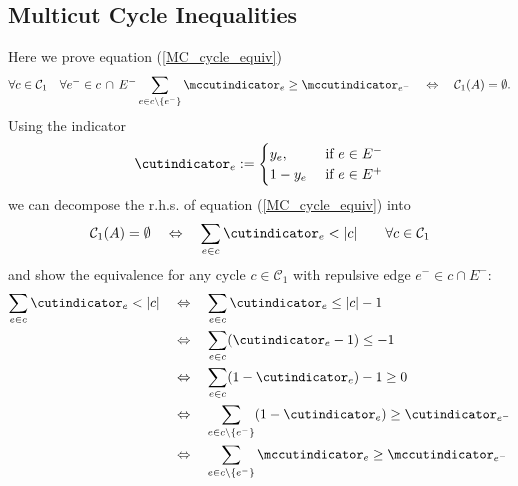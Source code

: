 
\subsection{Multicut Cycle Inequalities} \label{mccycle}

Here we prove equation (\ref{MC_cycle_equiv}) 
\begin{equation*}
  \forall c \in \mathcal{C}_1 \quad \forall e^- \in c \, \cap \, E^-  \sum_{e \in c\setminus \{e^-\}} \mccutindicator_e \ge \mccutindicator_{e^-} \quad \Leftrightarrow 
 \quad \mathcal{C}_1(A) = \emptyset.
\end{equation*}
Using the indicator $$\cutindicator_e: = \begin{cases}
        y_e, &\text{ if }e\in E^-\\
        1-y_e &\text{ if }e\in E^+\\
    \end{cases}$$
we can decompose the r.h.s. of equation (\ref{MC_cycle_equiv}) into 
\begin{equation}
\mathcal{C}_1(A) = \emptyset \quad \Leftrightarrow \quad  \sum_{e \in c} \cutindicator_e < |c| \qquad \forall c \in \mathcal{C}_1 \label{MC_cycle_equiv_supp}
\end{equation}
and show the equivalence for any cycle $ c \in \mathcal{C}_1$ with repulsive edge $e^- \in c \cap E^-$:
\begin{align*}
\sum_{e \in c} \cutindicator_e < |c| \quad & \Leftrightarrow \quad  \sum_{e \in c} \cutindicator_e \le |c| - 1\\
& \Leftrightarrow \quad \sum_{e \in c} (\cutindicator_e - 1) \le - 1 \\
& \Leftrightarrow \quad \sum_{e \in c} (1 - \cutindicator_e) - 1 \ge 0 \\
& \Leftrightarrow \quad \sum_{e \in c \setminus \{e^-\}} (1 - \cutindicator_e) \ge \cutindicator_{e^-} \\
& \Leftrightarrow \quad \sum_{e \in c \setminus \{e^-\}} \mccutindicator_e \ge \mccutindicator_{e^-}
\end{align*}

